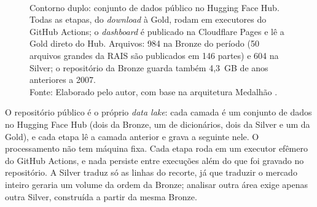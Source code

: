 \begin{figure}[htbp]
{%
    }
    \\[4pt]
    {\footnotesize Contorno duplo: conjunto de dados público no Hugging Face Hub. Todas as etapas, do \textit{download} à Gold, rodam em executores do GitHub Actions; o \textit{dashboard} é publicado na Cloudflare Pages e lê a Gold direto do Hub. Arquivos: 984 na Bronze do período (50 arquivos grandes da RAIS são publicados em 146 partes) e 604 na Silver; o repositório da Bronze guarda também 4,3~GB de anos anteriores a 2007.}
    \\[2pt]
    {\footnotesize Fonte: Elaborado pelo autor, com base na arquitetura Medalhão \cite{MicrosoftMedallion2024}.}
\end{figure}

O repositório público é o próprio \textit{data lake}: cada camada é um conjunto de dados no Hugging Face Hub (dois da Bronze, um de dicionários, dois da Silver e um da Gold), e cada etapa lê a camada anterior e grava a seguinte nele. O processamento não tem máquina fixa. Cada etapa roda em um executor efêmero do GitHub Actions, e nada persiste entre execuções além do que foi gravado no repositório. A Silver traduz só as linhas do recorte, já que traduzir o mercado inteiro geraria um volume da ordem da Bronze; analisar outra área exige apenas outra Silver, construída a partir da mesma Bronze.

